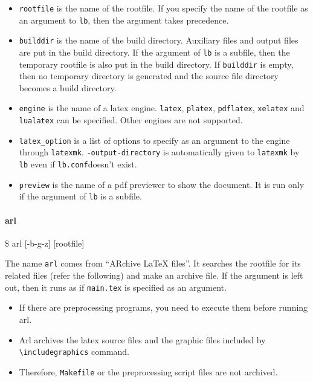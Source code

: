 \begin{itemize}
\tightlist
\item
  \texttt{rootfile} is the name of the rootfile. If you specify the name
  of the rootfile as an argument to \texttt{lb}, then the argument takes
  precedence.
\item
  \texttt{builddir} is the name of the build directory. Auxiliary files
  and output files are put in the build directory. If the argument of
  \texttt{lb} is a subfile, then the temporary rootfile is also put in
  the build directory. If \texttt{builddir} is empty, then no temporary
  directory is generated and the source file directory becomes a build
  directory.
\item
  \texttt{engine} is the name of a latex engine. \texttt{latex},
  \texttt{platex}, \texttt{pdflatex}, \texttt{xelatex} and
  \texttt{lualatex} can be specified. Other engines are not supported.
\item
  \texttt{latex\_option} is a list of options to specify as an argument
  to the engine through \texttt{latexmk}. \texttt{-output-directory} is
  automatically given to \texttt{latexmk} by \texttt{lb} even if
  \texttt{lb.conf}doesn't exist.
\item
  \texttt{preview} is the name of a pdf previewer to show the document.
  It is run only if the argument of \texttt{lb} is a subfile.
\end{itemize}

\hypertarget{arl}{%
\paragraph{arl}\label{arl}}

\$ arl {[}-b\textbar{}-g\textbar{}-z{]} {[}rootfile{]}

The name \texttt{arl} comes from ``ARchive LaTeX files''. It searches
the rootfile for its related files (refer the following) and make an
archive file. If the argument is left out, then it runs as if
\texttt{main.tex} is specified as an argument.

\begin{itemize}
\tightlist
\item
  If there are preprocessing programs, you need to execute them before
  running arl.
\item
  Arl archives the latex source files and the graphic files included by
  \texttt{\textbackslash{}includegraphics} command.
\item
  Therefore, \texttt{Makefile} or the preprocessing script files are not
  archived.
\end{itemize}


